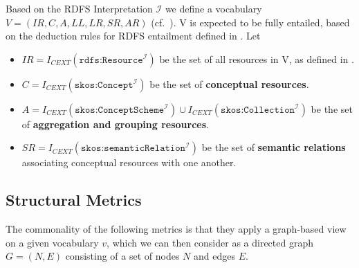 \begin{definition} Based on the RDFS Interpretation $\mathcal{I}$ we define a vocabulary $V = (IR, C, A, LL, LR, SR, AR)$ (cf.~\cite{Hitzler2009}). V is expected to be fully entailed, based on the deduction rules for RDFS entailment defined in \cite{RDFSEM2012}. Let

\begin{itemize}
	\item \(IR = I_{CEXT}(\texttt{rdfs:Resource}^\mathcal{I})\) be the set of all resources in V, as defined in \cite{RDFSEM2012}.

	\item \(C = I_{CEXT}(\texttt{skos:Concept}^\mathcal{I})\) be the set of \textbf{conceptual resources}.

  \item \(A = I_{CEXT}(\texttt{skos:ConceptScheme}^\mathcal{I}) \cup I_{CEXT}(\texttt{skos:Collection}^\mathcal{I})\) be the set of \textbf{aggregation and grouping resources}.


	\item \(SR = I_{CEXT}(\texttt{skos:semanticRelation}^\mathcal{I})\) be the set of \textbf{semantic relations} associating conceptual resources with one another.

\end{itemize}

\end{definition}

\subsection{Structural Metrics}

The commonality of the following metrics is that they apply a graph-based view on a given vocabulary \(v\), which we can then consider as a directed graph \(G=(N,E)\) consisting of a set of nodes \(N\) and edges \(E\).

